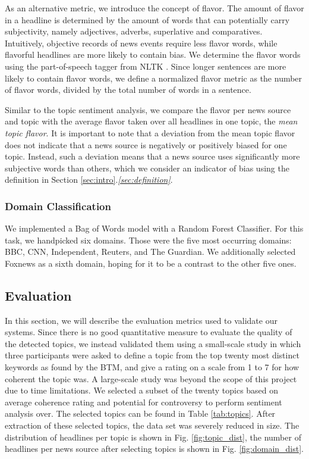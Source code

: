\documentclass[final]{ieee}
\begin{document}
As an alternative metric, we introduce the concept of flavor. The amount of flavor in a headline is determined by the amount of words that can potentially carry subjectivity, namely adjectives, adverbs, superlative and comparatives. Intuitively, objective records of news events require less flavor words, while flavorful headlines are more likely to contain bias. We determine the flavor words using the part-of-speech tagger from NLTK \cite{NLTK09}. Since longer sentences are more likely to contain flavor words, we define a normalized flavor metric as the number of flavor words, divided by the total number of words in a sentence.

Similar to the topic sentiment analysis, we compare the flavor per news source and topic with the average flavor taken over all headlines in one topic, the \textit{mean topic flavor}. It is important to note that a deviation from the mean topic flavor does not indicate that a news source is negatively or positively biased for one topic. Instead, such a deviation means that a news source uses significantly more subjective words than others, which we consider an indicator of bias using the definition in Section \ref{sec:intro}.\textit{\ref{sec:definition}}. 

\subsubsection{Domain Classification}
We implemented a Bag of Words model with a Random Forest Classifier. For this task, we handpicked six domains. Those were the five most occurring domains: BBC, CNN, Independent, Reuters, and The Guardian. We additionally selected Foxnews as a sixth domain, hoping for it to be a contrast to the other five ones.

\subsection{Evaluation}\label{sec:evaluation}

In this section, we will describe the evaluation metrics used to validate our systems. Since there is no good quantitative measure to evaluate the quality of the detected topics, we instead validated them using a small-scale study in which three participants were asked to define a topic from the top twenty most distinct keywords as found by the BTM, and give a rating on a scale from 1 to 7 for how coherent the topic was. A large-scale study was beyond the scope of this project due to time limitations. We selected a subset of the twenty topics based on average coherence rating and potential for controversy to perform sentiment analysis over. The selected topics can be found in Table \ref{tab:topics}. After extraction of these selected topics, the data set was severely reduced in size. The distribution of headlines per topic is shown in Fig. \ref{fig:topic_dist}, the number of headlines per news source after selecting topics is shown in Fig. \ref{fig:domain_dist}.
\end{document}
